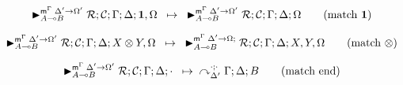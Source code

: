 
\begin{align}
\trans{\matstate{A \lolli B}{\rulestk}{\lstack{C}}{\Gamma}{\Delta}{\one,
   \Omega}{\Delta' \rightarrow \Omega'}}
{\matstate{A \lolli B}{\rulestk}{\lstack{C}}{\Gamma}{\Delta}{\Omega}{\Delta'
   \rightarrow \Omega'}} \tag{match $\one$}
\end{align}

\begin{align}
\trans{\matstate{A \lolli B}{\rulestk}{\lstack{C}}{\Gamma}{\Delta}{X \otimes Y,
   \Omega}{\Delta' \rightarrow \Omega'}}
{\matstate{A \lolli B}{\rulestk}{\lstack{C}}{\Gamma}{\Delta}{X, Y,
   \Omega}{\Delta' \rightarrow \Omega;}} \tag{match $\otimes$}
\end{align}

\begin{align}
\trans{\matstate{A \lolli
   B}{\rulestk}{\lstack{C}}{\Gamma}{\Delta}{\cdot}{\Delta' \rightarrow \Omega'}}
{
   \derstatex{\Gamma}{\Delta}{\Delta'}{\cdot}{\cdot}{B}
} \tag{match end}
\end{align}
